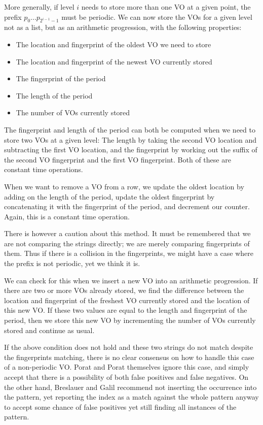 \documentclass[ %
                    author={Dominic Joseph Moylett},
                    degree={MEng},
                     title={Dictionary Matching with Fingerprints},
                  subtitle={An Empirical Analysis},
                      type={research},
                      year={2015} ]{dissertation}
\begin{document}
More generally, if level $i$ needs to store more than one VO at a given point, the prefix $p_0...p_{2^{i-1} - 1}$ must be periodic. We can now store the VOs for a given level not as a list, but as an arithmetic progression, with the following properties:

\begin{itemize}
  \item The location and fingerprint of the oldest VO we need to store
  \item The location and fingerprint of the newest VO currently stored
  \item The fingerprint of the period
  \item The length of the period
  \item The number of VOs currently stored
\end{itemize}

The fingerprint and length of the period can both be computed when we need to store two VOs at a given level: The length by taking the second VO location and subtracting the first VO location, and the fingerprint by working out the suffix of the second VO fingerprint and the first VO fingerprint. Both of these are constant time operations.

When we want to remove a VO from a row, we update the oldest location by adding on the length of the period, update the oldest fingerprint by concatenating it with the fingerprint of the period, and decrement our counter. Again, this is a constant time operation.

There is however a caution about this method. It must be remembered that we are not comparing the strings directly; we are merely comparing fingerprints of them. Thus if there is a collision in the fingerprints, we might have a case where the prefix is not periodic, yet we think it is.

We can check for this when we insert a new VO into an arithmetic progression. If there are two or more VOs already stored, we find the difference between the location and fingerprint of the freshest VO currently stored and the location of this new VO. If these two values are equal to the length and fingerprint of the period, then we store this new VO by incrementing the number of VOs currently stored and continue as usual.

If the above condition does not hold and these two strings do not match despite the fingerprints matching, there is no clear consensus on how to handle this case of a non-periodic VO. Porat and Porat themselves ignore this case, and simply accept that there is a possibility of both false positives and false negatives. On the other hand, Breslauer and Galil\cite{Breslauer:2014:RSS:2660854.2635814} recommend not inserting the occurrence into the pattern, yet reporting the index as a match against the whole pattern anyway to accept some chance of false positives yet still finding all instances of the pattern.
\end{document}
